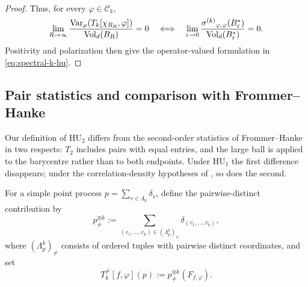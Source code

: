 \documentclass[11pt,reqno,a4paper]{amsart}
\numberwithin{equation}{section}
\theoremstyle{compact}
\theoremstyle{definition}
\theoremstyle{definition}
\newcommand{\HU}{\mathrm{HU}}
\newcommand{\Var}{\operatorname{Var}}
\newcommand{\Vol}{\operatorname{Vol}}
\newcommand{\sigmak}{\smash[t]{\sigma^{(k)}}}
\begin{document}
\begin{proof}
Thus, for every $\varphi\in\mathcal C_k$,
\begin{equation}\label{eq:geometric-spectral-coefficient-equivalence}
  \lim_{R\to\infty}
  \frac{\Var_\mu(T_k[\chi_{B_R},\varphi])}{\Vol_d(B_R)}=0
  \quad\Longleftrightarrow\quad
  \lim_{\varepsilon\to0}
  \frac{\sigmak_{\varphi,\varphi}(B_\varepsilon^*)}
       {\Vol_d(B_\varepsilon^*)}=0.
\end{equation}
Positivity and polarization then give the operator-valued formulation in
\eqref{eq:spectral-k-hu}.
\end{proof}

\subsection{Pair statistics and comparison with Frommer--Hanke}
\label{subsec:full-factorial}

Our definition of $\HU_2$ differs from the second-order statistics of
Frommer--Hanke \cite{FH26} in two respects: $T_2$ includes pairs with equal
entries, and the large ball is applied to the barycentre rather than to both
endpoints.  Under $\HU_1$ the first difference disappears; under the
correlation-density hypotheses of \cite[Proposition~4.1]{FH26}, so does the
second.

For a simple point process $p=\sum_{v\in\Lambda_p}\delta_v$, define the
pairwise-distinct contribution by
\begin{equation}\label{eq:factorial-tensor}
  p_{\neq}^{\otimes k}
  :=\sum_{(v_1,\ldots,v_k)\in(\Lambda_p^k)_{\neq}}
       \delta_{(v_1,\ldots,v_k)},
\end{equation}
where $(\Lambda_p^k)_{\neq}$ consists of ordered tuples with pairwise distinct
coordinates, and set
\begin{equation}\label{eq:factorial-pattern-statistic}
  T_k^{\neq}[f,\varphi](p)
  :=p_{\neq}^{\otimes k}(F_{f,\varphi}).
\end{equation}
\end{document}
